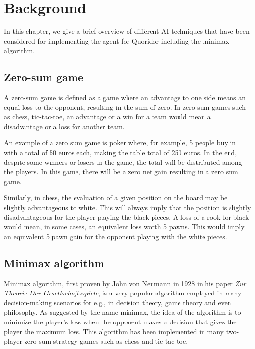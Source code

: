 \chapter{Background}
\label{background}

In this chapter, we give a brief overview of different \gls{AI} techniques that have been considered for implementing the agent for Quoridor including the minimax algorithm.

\section{Zero-sum game}
A zero-sum game is defined as a game where an advantage to one side means an equal loss to the opponent, resulting in the sum of zero. In zero sum games such as chess, tic-tac-toe, an advantage or a win for a team would mean a disadvantage or a loss for another team. 

An example of a zero sum game is poker where, for example, 5 people buy in with a total of 50 euros each, making the table total of 250 euros. In the end, despite some winners or losers in the game, the total will be distributed among the players. In this game, there will be a zero net gain resulting in a zero sum game.

Similarly, in chess, the evaluation of a given position on the board may be slightly advantageous to white. This will always imply that the position is slightly disadvantageous for the player playing the black pieces. A loss of a rook for black would mean, in some cases, an equivalent loss worth 5 pawns. This would imply an equivalent 5 pawn gain for the opponent playing with the white pieces.


\section{Minimax algorithm}

Minimax algorithm, first proven by John von Neumann in 1928 in his paper \textit{Zur Theorie Der Gesellschaftsspiele}, is a very popular algorithm employed in many decision-making scenarios for e.g., in decision theory, game theory and even philosophy. As suggested by the name minimax, the idea of the algorithm is to minimize the player's loss when the opponent makes a decision that gives the player the maximum loss. This algorithm has been implemented in many two-player zero-sum strategy games such as chess and tic-tac-toe.

